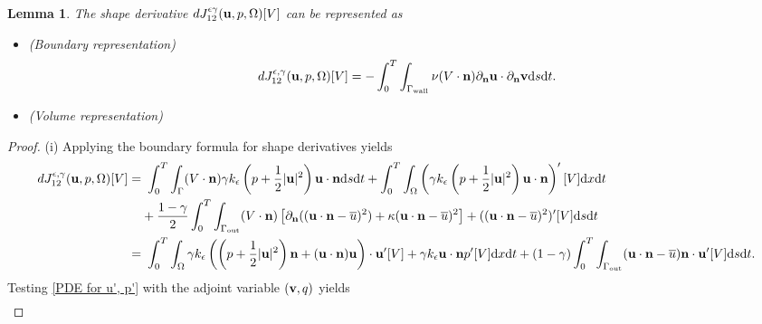 \documentclass[oneside,11pt]{book}
\numberwithin{equation}{section}
\newtheorem{lemma}{Lemma}[section]
\begin{document}
\begin{lemma}
    The shape derivative $dJ_{12}^{\epsilon\gamma}({\bf u},p,\Omega)[V]$ can be represented as
    \begin{itemize}
        \item[(i)] (Boundary representation)
        \begin{align}
            dJ_{12}^{\epsilon,\gamma}({\bf u},p,\Omega)[V] = -\int_0^T\int_{\Gamma_{\rm wall}} \nu(V\cdot{\bf n})\partial_{\bf n}{\bf u}\cdot\partial_{\bf n}{\bf v}{\rm d}s{\rm d}t.
        \end{align}
        \item[(ii)] (Volume representation)
    \end{itemize}
\end{lemma}

\begin{proof}
    (i) Applying the boundary formula for shape derivatives yields
    \begin{align}
        dJ_{12}^{\epsilon,\gamma}({\bf u},p,\Omega)[V] =&\ \int_0^T\int_\Gamma (V\cdot{\bf n})\gamma k_\epsilon\left(p + \frac{1}{2}|{\bf u}|^2\right){\bf u}\cdot{\bf n}{\rm d}s{\rm d}t + \int_0^T\int_\Omega \left(\gamma k_\epsilon\left(p + \frac{1}{2}|{\bf u}|^2\right){\bf u}\cdot{\bf n}\right)'[V]{\rm d}x{\rm d}t\\
        &+\frac{1 - \gamma}{2}\int_0^T\int_{\Gamma_{\rm out}} (V\cdot{\bf n})\left[\partial_{\bf n}(({\bf u}\cdot{\bf n} - \overline{u})^2) + \kappa({\bf u}\cdot{\bf n} - \overline{u})^2\right] + (({\bf u}\cdot{\bf n} - \overline{u})^2)'[V]{\rm d}s{\rm d}t\\
        =&\ \int_0^T\int_\Omega \gamma k_\epsilon\left(\left(p + \frac{1}{2}|{\bf u}|^2\right){\bf n} + ({\bf u}\cdot{\bf n}){\bf u}\right)\cdot{\bf u}'[V] + \gamma k_\epsilon{\bf u}\cdot{\bf n}p'[V]{\rm d}x{\rm d}t + (1 - \gamma)\int_0^T\int_{\Gamma_{\rm out}} ({\bf u}\cdot{\bf n} - \overline{u}){\bf n}\cdot{\bf u}'[V]{\rm d}s{\rm d}t.\label{3.7.6}
    \end{align}
    Testing \eqref{PDE for u', p'} with the adjoint variable $({\bf v},q)$ yields
    \begin{align}

\end{align}
\end{proof}
\end{document}
